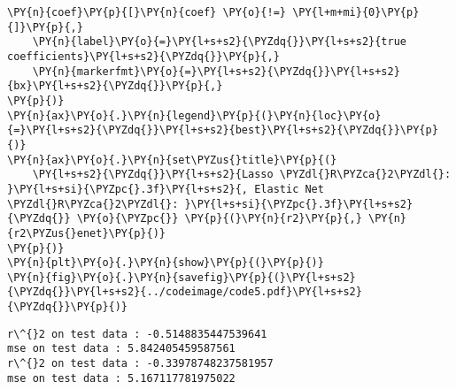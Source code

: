 \begin{Verbatim}[commandchars=\\\{\}]
    \PY{n}{coef}\PY{p}{[}\PY{n}{coef} \PY{o}{!=} \PY{l+m+mi}{0}\PY{p}{]}\PY{p}{,}
    \PY{n}{label}\PY{o}{=}\PY{l+s+s2}{\PYZdq{}}\PY{l+s+s2}{true coefficients}\PY{l+s+s2}{\PYZdq{}}\PY{p}{,}
    \PY{n}{markerfmt}\PY{o}{=}\PY{l+s+s2}{\PYZdq{}}\PY{l+s+s2}{bx}\PY{l+s+s2}{\PYZdq{}}\PY{p}{,}
\PY{p}{)}
\PY{n}{ax}\PY{o}{.}\PY{n}{legend}\PY{p}{(}\PY{n}{loc}\PY{o}{=}\PY{l+s+s2}{\PYZdq{}}\PY{l+s+s2}{best}\PY{l+s+s2}{\PYZdq{}}\PY{p}{)}
\PY{n}{ax}\PY{o}{.}\PY{n}{set\PYZus{}title}\PY{p}{(}
    \PY{l+s+s2}{\PYZdq{}}\PY{l+s+s2}{Lasso \PYZdl{}R\PYZca{}2\PYZdl{}: }\PY{l+s+si}{\PYZpc{}.3f}\PY{l+s+s2}{, Elastic Net \PYZdl{}R\PYZca{}2\PYZdl{}: }\PY{l+s+si}{\PYZpc{}.3f}\PY{l+s+s2}{\PYZdq{}} \PY{o}{\PYZpc{}} \PY{p}{(}\PY{n}{r2}\PY{p}{,} \PY{n}{r2\PYZus{}enet}\PY{p}{)}
\PY{p}{)}
\PY{n}{plt}\PY{o}{.}\PY{n}{show}\PY{p}{(}\PY{p}{)}
\PY{n}{fig}\PY{o}{.}\PY{n}{savefig}\PY{p}{(}\PY{l+s+s2}{\PYZdq{}}\PY{l+s+s2}{../codeimage/code5.pdf}\PY{l+s+s2}{\PYZdq{}}\PY{p}{)}
\end{Verbatim}

\begin{Verbatim}[commandchars=\\\{\}]
r\^{}2 on test data : -0.5148835447539641
mse on test data : 5.842405459587561
r\^{}2 on test data : -0.33978748237581957
mse on test data : 5.167117781975022
\end{Verbatim}
